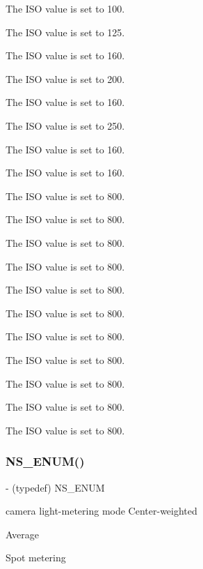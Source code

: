 The I\+SO value is set to 100.

The I\+SO value is set to 125.

The I\+SO value is set to 160.

The I\+SO value is set to 200.

The I\+SO value is set to 160.

The I\+SO value is set to 250.

The I\+SO value is set to 160.

The I\+SO value is set to 160.

The I\+SO value is set to 800.

The I\+SO value is set to 800.

The I\+SO value is set to 800.

The I\+SO value is set to 800.

The I\+SO value is set to 800.

The I\+SO value is set to 800.

The I\+SO value is set to 800.

The I\+SO value is set to 800.

The I\+SO value is set to 800.

The I\+SO value is set to 800.

The I\+SO value is set to 800.\mbox{\label{interface_p_v_eye_camera_settings_def_af598fa70d30fe897cfabf70c44a8aabd}} 
\subsubsection{\texorpdfstring{N\+S\+\_\+\+E\+N\+U\+M()}{NS\_ENUM()}\hspace{0.1cm}{\footnotesize\ttfamily [15/17]}}
{\footnotesize\ttfamily -\/ (typedef) N\+S\+\_\+\+E\+N\+UM \begin{DoxyParamCaption}\item[{(N\+S\+U\+Integer)}]{ }\item[{(P\+V\+Eye\+Camera\+Metering\+Mode)}]{ }\end{DoxyParamCaption}}

camera light-\/metering mode Center-\/weighted

Average

Spot metering\mbox{\label{interface_p_v_eye_camera_settings_def_afc5fd6fd6ffcc4165f823ca624af0c8d}} 
